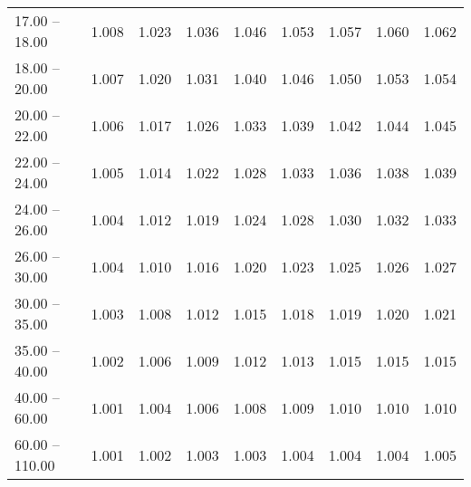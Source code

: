 \begin{table}[htp]
\begin{tiny}
\begin{center}
\begin{tabular}{|l|c|c|c|c|c|c|c|c|}
      17.00 -- 18.00 &  1.008 & 1.023 & 1.036 & 1.046 & 1.053 & 1.057 & 1.060 & 1.062 \\ 
      18.00 -- 20.00 &  1.007 & 1.020 & 1.031 & 1.040 & 1.046 & 1.050 & 1.053 & 1.054 \\ 
      20.00 -- 22.00 &  1.006 & 1.017 & 1.026 & 1.033 & 1.039 & 1.042 & 1.044 & 1.045 \\ 
      22.00 -- 24.00 &  1.005 & 1.014 & 1.022 & 1.028 & 1.033 & 1.036 & 1.038 & 1.039 \\ 
      24.00 -- 26.00 &  1.004 & 1.012 & 1.019 & 1.024 & 1.028 & 1.030 & 1.032 & 1.033 \\ 
      26.00 -- 30.00 &  1.004 & 1.010 & 1.016 & 1.020 & 1.023 & 1.025 & 1.026 & 1.027 \\ 
      30.00 -- 35.00 &  1.003 & 1.008 & 1.012 & 1.015 & 1.018 & 1.019 & 1.020 & 1.021 \\ 
      35.00 -- 40.00 &  1.002 & 1.006 & 1.009 & 1.012 & 1.013 & 1.015 & 1.015 & 1.015 \\ 
      40.00 -- 60.00 &  1.001 & 1.004 & 1.006 & 1.008 & 1.009 & 1.010 & 1.010 & 1.010 \\ 
      60.00 -- 110.00 &  1.001 & 1.002 & 1.003 & 1.003 & 1.004 & 1.004 & 1.004 & 1.005 \\ 
\hline
\end{tabular} 
             \end{center} 
             \end{tiny} 
             \label{tab:sa_offP_jpsi8} 
             \end{table}


